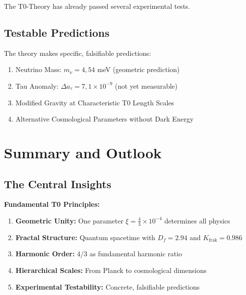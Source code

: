 \documentclass[12pt,a4paper]{article}
\newcommand{\xipar}{\xi}
\begin{document}
	The T0-Theory has already passed several experimental tests.
	
	\subsection{Testable Predictions}
	
	\begin{keyresult}
		The theory makes specific, falsifiable predictions:
		\begin{enumerate}
			\item Neutrino Mass: $m_\nu = 4{,}54$ meV (geometric prediction)
			\item Tau Anomaly: $\Delta a_\tau = 7{,}1 \times 10^{-9}$ (not yet measurable)
			\item Modified Gravity at Characteristic T0 Length Scales
			\item Alternative Cosmological Parameters without Dark Energy
		\end{enumerate}
	\end{keyresult}
	
	\section{Summary and Outlook}
	
	\subsection{The Central Insights}
	
	\begin{foundation}
		\textbf{Fundamental T0 Principles:}
		
		\begin{enumerate}
			\item \textbf{Geometric Unity:} One parameter $\xipar = \frac{4}{3} \times 10^{-4}$ determines all physics
			\item \textbf{Fractal Structure:} Quantum spacetime with $D_f = 2.94$ and $K_{\text{frak}} = 0.986$
			\item \textbf{Harmonic Order:} 4/3 as fundamental harmonic ratio
			\item \textbf{Hierarchical Scales:} From Planck to cosmological dimensions
			\item \textbf{Experimental Testability:} Concrete, falsifiable predictions
		\end{enumerate}
	\end{foundation}
	
	
\end{document}
